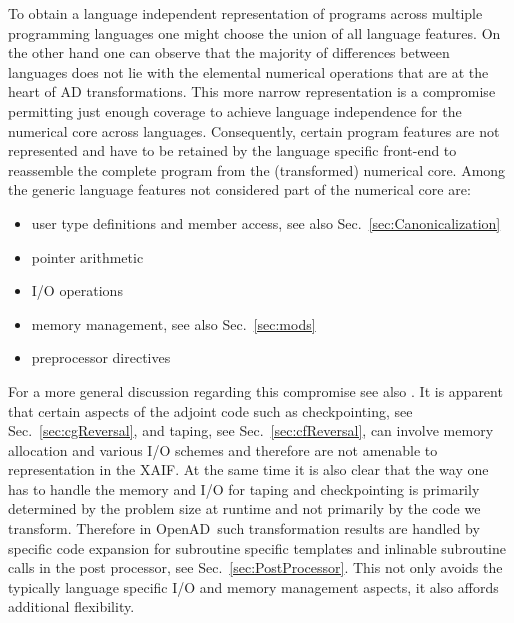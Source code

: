 \documentclass{book}
\newcommand{\OpenAD}{OpenAD}
\newcommand{\xaif}{XAIF}
\newcommand{\refsec}[1]{{Sec.~\ref{#1}}}
\begin{document}
To obtain a language independent representation of programs across multiple 
programming languages one might choose the union of all language features. 
On the other hand one can observe that the majority of differences between 
languages does not lie with the elemental numerical operations that are at the 
heart of AD transformations. This more narrow representation 
is a compromise permitting just enough coverage to achieve language 
independence for the numerical core across languages.
Consequently, certain program features are not represented and have 
to be retained by the language specific front-end to reassemble the 
complete program from the (transformed) numerical core.
Among the generic language features not considered part of the numerical core are: 
\begin{itemize}
  \parskip = -2pt
\item user type definitions and member access, see also \refsec{sec:Canonicalization}
\item pointer arithmetic
\item I/O operations  
\item memory management, see also \refsec{sec:mods}
\item preprocessor directives
\end{itemize}
For a more general discussion regarding this compromise see also \cite{UtNa04SLD}.
It is apparent that certain aspects of the adjoint code such as 
checkpointing, see \refsec{sec:cgReversal}, and taping, see \refsec{sec:cfReversal},
can involve memory allocation and various I/O schemes and therefore 
are not amenable to representation in the \xaif. 
At the same time it is also clear that the way  one has to handle the memory and I/O for 
taping and checkpointing is primarily determined by the problem size at runtime and not
primarily by the code we transform.   
Therefore in \OpenAD\ such transformation results are handled by  specific 
code expansion for subroutine specific templates and inlinable subroutine calls 
in the post processor, see \refsec{sec:PostProcessor}. This not only avoids 
the typically language specific I/O and memory management aspects, it also 
affords additional flexibility.   
\end{document}
